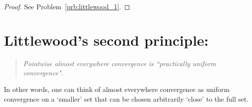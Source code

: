 \begin{proof}
See Problem~\ref{prb:littlewood_1}.
\end{proof}



\section{Littlewood's second principle:} 
\begin{quotation}
	\emph{Pointwise almost everywhere convergence is ``practically uniform convergence"}.
\end{quotation}

In other words, one can think of almost everywhere convergence as uniform convergence on a `smaller' set that can be chosen arbitrarily `close' to the full set. 

